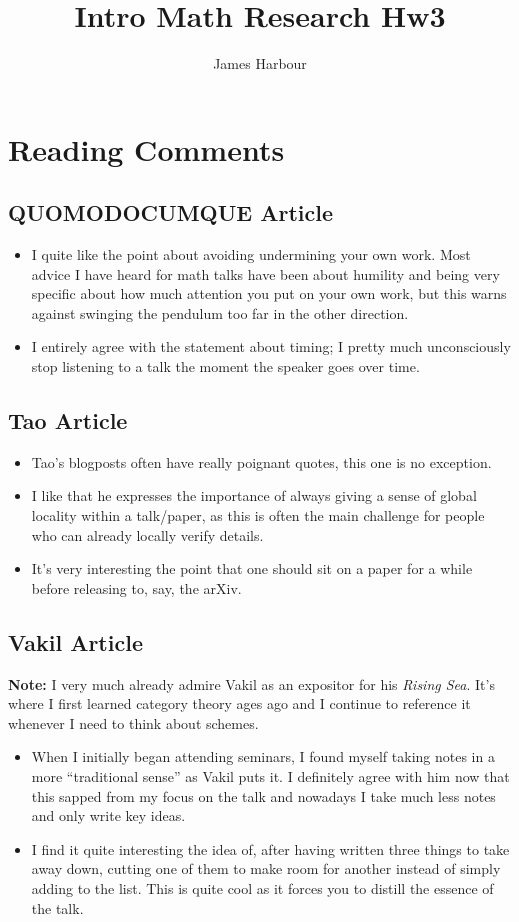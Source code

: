 \documentclass[12pt]{article}
\title{Intro Math Research Hw3}
\author{James Harbour}
\begin{document}
\maketitle


\section{Reading Comments}

\subsection*{QUOMODOCUMQUE Article}
\begin{itemize}
  \item I quite like the point about avoiding undermining your own work. Most advice I have heard for math talks have been about humility and being very specific about how much attention you put on your own work, but this warns against swinging the pendulum too far in the other direction.
  \item I entirely agree with the statement about timing; I pretty much unconsciously stop listening to a talk the moment the speaker goes over time.
\end{itemize}

\subsection*{Tao Article}
\begin{itemize}
  \item Tao's blogposts often have really poignant quotes, this one is no exception.
  \item I like that he expresses the importance of always giving a sense of global locality within a talk/paper, as this is often the main challenge for people who can already locally verify details. 
  \item It's very interesting the point that one should sit on a paper for a while before releasing to, say, the arXiv. 
\end{itemize}

\subsection*{Vakil Article}
  \textbf{Note:} I very much already admire Vakil as an expositor for his \textit{Rising Sea}. It's where I first learned category theory ages ago and I continue to reference it whenever I need to think about schemes.
\begin{itemize}
  \item When I initially began attending seminars, I found myself taking notes in a more ``traditional sense'' as Vakil puts it. I definitely agree with him now that this sapped from my focus on the talk and nowadays I take much less notes and only write key ideas.
  \item I find it quite interesting the idea of, after having written three things to take away down, cutting one of them to make room for another instead of simply adding to the list. This is quite cool as it forces you to distill the essence of the talk.
\end{itemize}
\end{document}
